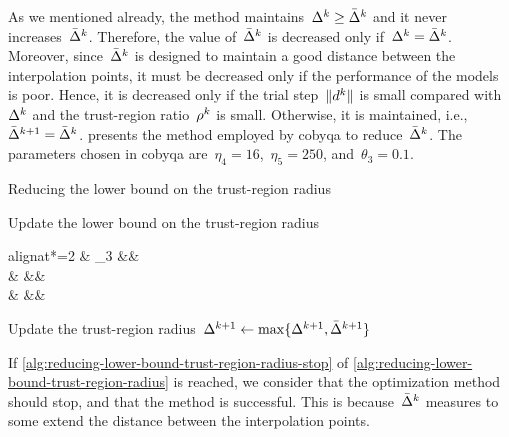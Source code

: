 As we mentioned already, the method maintains~$\rad[k] \ge \radlb[k]$ and it never increases~$\radlb[k]$.
Therefore, the value of~$\radlb[k]$ is decreased only if~$\rad[k] = \radlb[k]$.
Moreover, since~$\radlb[k]$ is designed to maintain a good distance between the interpolation points, it must be decreased only if the performance of the models is poor.
Hence, it is decreased only if the trial step~$\norm{\step[k]}$ is small compared with~$\rad[k]$ and the trust-region ratio~$\ratio[k]$ is small.
Otherwise, it is maintained, i.e.,~$\radlb[k + 1] = \radlb[k]$.
 presents the method employed by \gls{cobyqa} to reduce~$\radlb[k]$.
The parameters chosen in \gls{cobyqa} are~$\eta_4 = 16$,~$\eta_5 = 250$, and~$\theta_3 = 0.1$.

\begin{algorithm}
    \caption{Reducing the lower bound on the trust-region radius}
    \label{alg:reducing-lower-bound-trust-region-radius}
    \DontPrintSemicolon
    Update the lower bound on the trust-region radius
    \begin{algoempheq}[left={\radlb[k + 1] \gets \empheqlbrace}]{alignat*=2}
        & \theta_3 \radlb[k]                && \quad {}\\
        & \sqrt{\radlb[k] \radlb[\infty]}   && \quad {}\\
        & \radlb[\infty]                    && \quad {}
    \end{algoempheq}
    Update the trust-region radius~$\rad[k + 1] \gets \max \set{\rad[k + 1], \radlb[k + 1]}$\;
\end{algorithm}

If \cref{alg:reducing-lower-bound-trust-region-radius-stop} of \cref{alg:reducing-lower-bound-trust-region-radius} is reached, we consider that the optimization method should stop, and that the method is successful.
This is because~$\radlb[k]$ measures to some extend the distance between the interpolation points.

